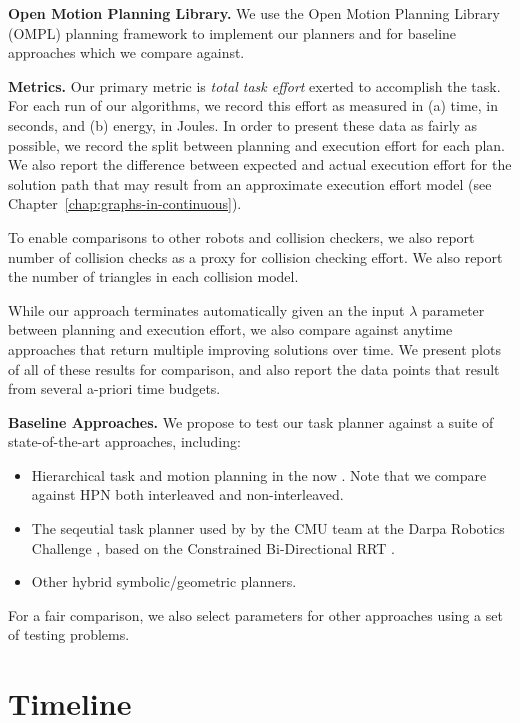 {\textbf{Open Motion Planning Library.}
We use the Open Motion Planning Library (OMPL)
planning framework \citep{sucan2012ompl}
to implement our planners
and for baseline approaches which we compare against.

\textbf{Metrics.}
Our primary metric is \emph{total task effort} exerted to accomplish
the task.
For each run of our algorithms,
we record this effort as measured in
(a) time, in seconds,
and (b) energy, in Joules.
In order to present these data as fairly as possible,
we record the split between planning and execution effort
for each plan.
We also report the difference between expected and actual
execution effort for the solution path
that may result from an approximate execution effort model
(see Chapter~\ref{chap:graphs-in-continuous}).

To enable comparisons to other robots and collision checkers,
we also report number of collision checks as a proxy for collision
checking effort.
We also report the number of triangles in each collision model.

While our approach terminates automatically
given an the input $\lambda$ parameter between planning and execution
effort,
we also compare against anytime approaches that return multiple
improving solutions over time.
We present plots of all of these results for comparison,
and also report the data points that result from several
a-priori time budgets.

\textbf{Baseline Approaches.}
We propose to test our task planner against a suite of
state-of-the-art approaches,
including:
\begin{itemize}
\item Hierarchical task and motion planning in the now
   \citep{kaelbling2011inthenow}.
   Note that we compare against HPN both
   interleaved and non-interleaved.
\item The seqeutial task planner used by by the CMU team
   at the Darpa Robotics Challenge
   \citep{dellin2014drc},
   based on the Constrained Bi-Directional RRT
   \cite{berenson2009manifolds}.
\item Other hybrid symbolic/geometric planners.
\end{itemize}
For a fair comparison,
we also select parameters for other approaches using a set of testing
problems.

}%

\section{Timeline}

